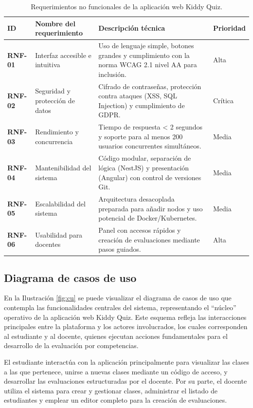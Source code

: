 \begin{table}[H]\centering
\caption{Requerimientos no funcionales de la aplicación web Kiddy Quiz.}\label{tab:rnf}
\footnotesize\renewcommand{\arraystretch}{1.2}
\begin{tabularx}{\textwidth}{|>{\bfseries}p{1.5cm}|p{4.2cm}|X|p{1.5cm}|}
\hline\rowcolor{headblue}\textbf{ID} & \textbf{Nombre del requerimiento} & \textbf{Descripción técnica} & \textbf{Prioridad}\\\hline
RNF-01 & Interfaz accesible e intuitiva & Uso de lenguaje simple, botones grandes y cumplimiento con la norma WCAG 2.1 nivel AA para inclusión. & Alta \\\hline
RNF-02 & Seguridad y protección de datos & Cifrado de contraseñas, protección contra ataques (XSS, SQL Injection) y cumplimiento de GDPR. & Crítica \\\hline
RNF-03 & Rendimiento y concurrencia & Tiempo de respuesta < 2 segundos y soporte para al menos 200 usuarios concurrentes simultáneos. & Media \\\hline
RNF-04 & Mantenibilidad del sistema & Código modular, separación de lógica (NestJS) y presentación (Angular) con control de versiones Git. & Media \\\hline
RNF-05 & Escalabilidad del sistema & Arquitectura desacoplada preparada para añadir nodos y uso potencial de Docker/Kubernetes. & Media \\\hline
RNF-06 & Usabilidad para docentes & Panel con accesos rápidos y creación de evaluaciones mediante pasos guiados. & Alta \\\hline
\end{tabularx}\end{table}
\elaboracion

\subsection{Diagrama de casos de uso}

En la Ilustración \ref{fig:cu} se puede visualizar el diagrama de casos de uso que contempla las funcionalidades centrales del sistema, representando el ``núcleo'' operativo de la aplicación web Kiddy Quiz. Este esquema refleja las interacciones principales entre la plataforma y los actores involucrados, los cuales corresponden al estudiante y al docente, quienes ejecutan acciones fundamentales para el desarrollo de la evaluación por competencias.

El estudiante interactúa con la aplicación principalmente para visualizar las clases a las que pertenece, unirse a nuevas clases mediante un código de acceso, y desarrollar las evaluaciones estructuradas por el docente. Por su parte, el docente utiliza el sistema para crear y gestionar clases, administrar el listado de estudiantes y emplear un editor completo para la creación de evaluaciones.

